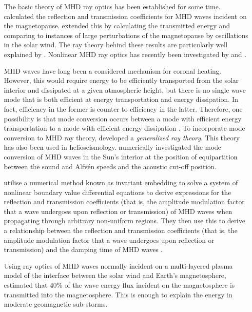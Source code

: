 \documentclass[12pt]{../style-files/ociamthesis}
\begin{document}
	The basic theory of MHD ray optics has been established for some time. \cite{mck70} calculated the reflection and transmission coefficients for MHD waves incident on the magnetopause. \cite{ver73} extended this by calculating the transmitted energy and \cite{wol_etal75} comparing to instances of large perturbations of the magnetopause by oscillations in the solar wind. The ray theory behind these results are particularly well explained by \cite{wal04}. Nonlinear MHD ray optics has recently been investigated by \cite{nun18} and \cite{nun20}.
	
	MHD waves have long been a considered mechanism for coronal heating. However, this would require energy to be efficiently transported from the solar interior and dissipated at a given atmospheric height, but there is no single wave mode that is both efficient at energy transportation and energy dissipation. In fact, efficiency in the former is counter to efficiency in the latter. Therefore, one possibility is that mode conversion occurs between a mode with efficient energy transportation to a mode with efficient energy dissipation \citep{par_etal12}. To incorporate mode conversion to MHD ray theory, \cite{shu_etal06} developed a \textit{generalized ray theory}. This theory has also been used in helioseismology. \cite{cal06} numerically investigated the mode conversion of MHD waves in the Sun's interior at the position of equipartition between the sound and Alfv\'{e}n speeds and the acoustic cut-off position.
	
	\cite{lee_etal02a} utilise a numerical method known as invariant embedding to solve a system of nonlinear boundary value differential equations to derive expressions for the reflection and transmission coefficients (that is, the amplitude modulation factor that a wave undergoes upon reflection or transmission) of MHD waves when propagating through arbitrary non-uniform regions. They then use this to derive a relationship between the reflection and transmission coefficients (that is, the amplitude modulation factor that a wave undergoes upon reflection or transmission) and the damping time of MHD waves \citep{lee_etal02b}.
	
	Using ray optics of MHD waves normally incident on a multi-layered plasma model of the interface between the solar wind and Earth's magnetosphere, \cite{leo_etal03} estimated that 40\% of the wave energy flux incident on the magnetosphere is transmitted into the magnetosphere. This is enough to explain the energy in moderate geomagnetic sub-storms.
	
\end{document}
